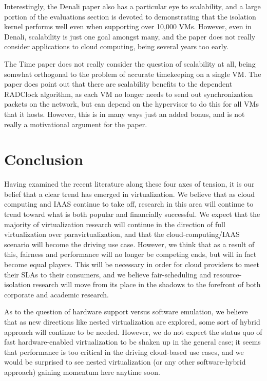 \documentclass[letterpaper, twocolumn]{article}
\begin{document}
Interestingly, the Denali paper also has a particular eye to scalability, and a large
portion of the evaluations section is devoted to demonstrating that the isolation kernel
performs well even when supporting over 10,000 VMs.  However, even in Denali, scalability
is just one goal amongst many, and the paper does not really consider applications
to cloud computing, being several years too early.

The Time paper does not really consider the question of scalability at all, being
somwhat orthogonal to the problem of accurate timekeeping on a single VM.  The paper
does point out that there are scalability benefits to the dependent RADClock algorithm,
as each VM no longer needs to send out synchronization packets on the network, but can
depend on the hypervisor to do this for all VMs that it hosts.  However, this is 
in many ways just an added bonus, and is not really a motivational argument for the paper.

\section{Conclusion}
\label{sec:conclusion}

Having examined the recent literature along these four axes of tension, it is our belief
that a clear trend has emerged in virtualization.  We believe that as cloud computing and
IAAS continue to take off, research in this area will continue to trend toward what
is both popular and financially successful.  We expect that the majority of virtualization
research will continue in the direction of full virtualization over paravirtualization,
and that the cloud-computing/IAAS scenario will become the driving use case.
However, we think that as a result of this, fairness and performance will no longer be
competing ends, but will in fact become equal players.  This will be necessary in order
for cloud providers to meet their SLAs to their consumers, and we believe fair-scheduling
and resource-isolation research will move from its place in the shadows to the forefront
of both corporate and academic research.

As to the question of hardware support versus software emulation, we believe that as
new directions like nested virtualization are explored, some sort of hybrid approach
will continue to be needed.  However, we do not expect the status quo of fast hardware-enabled
virtualization to be shaken up in the general case; it seems that performance is too critical
in the driving cloud-based use cases, and we would be surprised to see nested virtualization
(or any other software-hybrid approach) gaining momentum here anytime soon.
\end{document}
